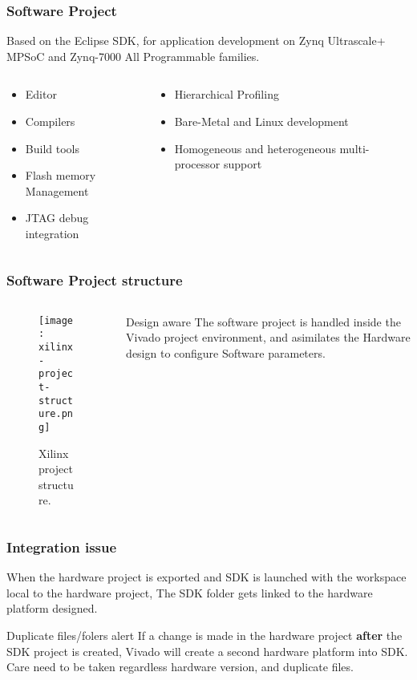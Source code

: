 \begin{frame}
	\frametitle{Software Project}
	Based on the Eclipse SDK, for application development on Zynq Ultrascale+ MPSoC and Zynq-7000 All Programmable families.
	\vfill
	\begin{columns}
		\begin{column}{0.5\textwidth}
			\begin{itemize}
				\item Editor
				\item Compilers
				\item Build tools
				\item Flash memory Management
				\item JTAG debug integration
			\end{itemize}
		\end{column}
		\begin{column}{0.5\textwidth}
			\begin{itemize}
				\item Hierarchical Profiling
				\item Bare-Metal and Linux development
				\item Homogeneous and heterogeneous multi-processor support
			\end{itemize}
		\end{column}
	\end{columns}
\end{frame}

\begin{frame}
	\frametitle{Software Project structure}
	\begin{columns}
		\begin{column}{0.5\textwidth}
			\begin{figure}
				\texttt{[image: xilinx-project-structure.png]}
				\caption{Xilinx project structure.}\label{fig:xilinx-project-structure}
			\end{figure}
		\end{column}
		\begin{column}{0.5\textwidth}
			\begin{block}{Design aware}
				The software project is handled inside the Vivado project environment, and asimilates the Hardware design to configure Software parameters.
			\end{block}
		\end{column}
	\end{columns}
\end{frame}

\begin{frame}
	\frametitle{Integration issue}
	When the hardware project is exported and SDK is launched with the workspace local to the hardware project, The SDK folder gets linked to the hardware platform designed.
	\vfill
	\begin{alertblock}{Duplicate files/folers alert}
		If a change is made in the hardware project \textbf{after} the SDK project is created, Vivado will create a second hardware platform into SDK. Care need to be taken regardless hardware version, and duplicate files.
	\end{alertblock}
\end{frame}

